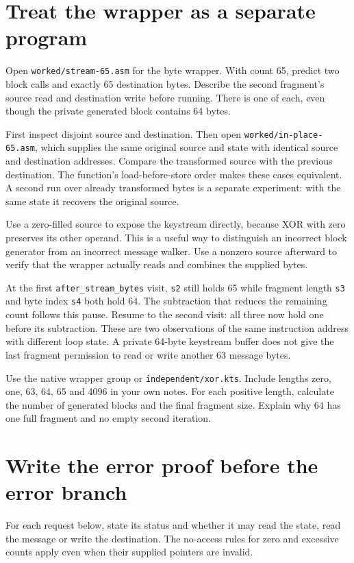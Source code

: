 \section{Treat the wrapper as a separate program}

Open \texttt{worked/stream-65.asm} for the byte wrapper. With count 65, predict two
block calls and exactly 65 destination bytes. Describe the second fragment's
source read and destination write before running. There is one of each, even
though the private generated block contains 64 bytes.

First inspect disjoint source and destination. Then open
\texttt{worked/in-place-65.asm}, which supplies the same original source and
state with identical source and destination addresses. Compare the transformed source
with the previous destination. The function's load-before-store order makes
these cases equivalent. A second run over already transformed bytes is a
separate experiment: with the same state it recovers the original source.

Use a zero-filled source to expose the keystream directly, because XOR with zero
preserves its other operand. This is a useful way to distinguish an incorrect
block generator from an incorrect message walker. Use a nonzero source afterward
to verify that the wrapper actually reads and combines the supplied bytes.

At the first \texttt{after\_stream\_bytes} visit, \texttt{s2} still holds 65
while fragment length \texttt{s3} and byte index \texttt{s4} both hold 64. The
subtraction that reduces the remaining count follows this pause. Resume to the
second visit: all three now hold one before its subtraction. These are two
observations of the same instruction address with different loop state. A
private 64-byte keystream buffer does not give the last fragment permission to
read or write another 63 message bytes.

Use the native wrapper group or \texttt{independent/xor.kts}.
Include lengths zero, one, 63, 64, 65 and 4096
in your own notes. For each positive length, calculate the number of generated
blocks and the final fragment size. Explain why 64 has one full fragment and
no empty second iteration.

\section{Write the error proof before the error branch}

For each request below, state its status and whether it may read the state,
read the message or write the destination. The no-access rules for zero and
excessive counts apply even when their supplied pointers are invalid.

